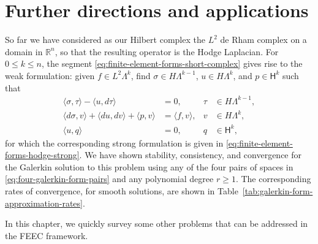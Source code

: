 \clearpage\setcounter{section}{7}
\section{{Further directions and applications}}\label{chap:further-directions}

{So far we have considered as our Hilbert complex the $L^2$ de Rham complex on a domain in $\mathbb R^n$, so that the resulting operator is the Hodge Laplacian. For $0\leq k\leq n$, the segment \eqref{eq:finite-element-forms-short-complex} gives rise to the weak formulation: given $f\in L^2\Lambda^k$, find $\sigma\in H\Lambda^{k-1}$, $u\in H\Lambda^k$, and $p\in\mathsf H^k$ such that}
\begin{equation}\label{eq:general-hodge-weak-formulation}
\begin{aligned}
\langle\sigma,\tau\rangle-\langle u,d\tau\rangle&=0,&\tau&\in H\Lambda^{k-1},\\
\langle d\sigma,v\rangle+\langle du,dv\rangle+\langle p,v\rangle&=\langle f,v\rangle,&v&\in H\Lambda^k,\\
\langle u,q\rangle&=0,&q&\in\mathsf H^k,
\end{aligned}
\end{equation}
{for which the corresponding strong formulation is given in \eqref{eq:finite-element-forms-hodge-strong}. We have shown stability, consistency, and convergence for the Galerkin solution to this problem using any of the four pairs of spaces in \eqref{eq:four-galerkin-form-pairs} and any polynomial degree $r\geq1$. The corresponding rates of convergence, for smooth solutions, are shown in Table~\ref{tab:galerkin-form-approximation-rates}.}

{In this chapter, we quickly survey some other problems that can be addressed in the FEEC framework.}
